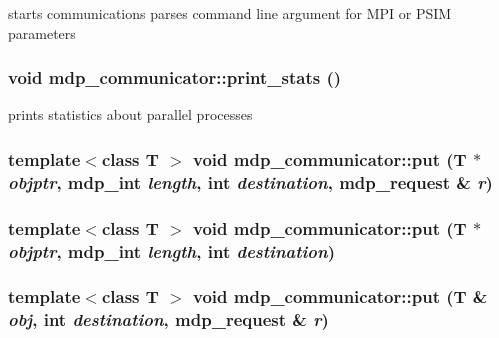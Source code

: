 \label{classmdp__communicator_af2c43869a689b8f1d020d4c4995b0cee}
starts communications parses command line argument for MPI or PSIM parameters \hypertarget{classmdp__communicator_a33ee55b0c67b1f63fd3a100e36fcc35e}{
\subsubsection[{print\_\-stats}]{\setlength{\rightskip}{0pt plus 5cm}void mdp\_\-communicator::print\_\-stats ()}}
\label{classmdp__communicator_a33ee55b0c67b1f63fd3a100e36fcc35e}


prints statistics about parallel processes \hypertarget{classmdp__communicator_a44cbcb7d57c5e01d6526e749b9640d68}{
\subsubsection[{put}]{\setlength{\rightskip}{0pt plus 5cm}template$<$class T $>$ void mdp\_\-communicator::put (T $\ast$ {\em objptr}, \/  {\bf mdp\_\-int} {\em length}, \/  int {\em destination}, \/  {\bf mdp\_\-request} \& {\em r})}}
\label{classmdp__communicator_a44cbcb7d57c5e01d6526e749b9640d68}
\hypertarget{classmdp__communicator_a14a43410b3c704b9f01f698f8e77349e}{
\subsubsection[{put}]{\setlength{\rightskip}{0pt plus 5cm}template$<$class T $>$ void mdp\_\-communicator::put (T $\ast$ {\em objptr}, \/  {\bf mdp\_\-int} {\em length}, \/  int {\em destination})}}
\label{classmdp__communicator_a14a43410b3c704b9f01f698f8e77349e}
\hypertarget{classmdp__communicator_ae684429614dd4d06cead7fb9ea241ff0}{
\subsubsection[{put}]{\setlength{\rightskip}{0pt plus 5cm}template$<$class T $>$ void mdp\_\-communicator::put (T \& {\em obj}, \/  int {\em destination}, \/  {\bf mdp\_\-request} \& {\em r})}}
